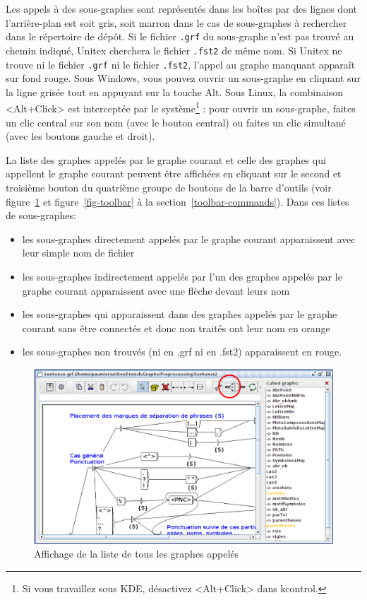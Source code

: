 
\bigskip
\noindent Les appels à des sous-graphes sont représentés dans les boîtes par des lignes dont
l’arrière-plan est soit gris, soit marron dans le cas de sous-graphes à rechercher dans le 
répertoire de dépôt. Si le fichier \verb+.grf+ du sous-graphe n'est pas trouvé au chemin indiqué,
Unitex cherchera le fichier \verb+.fst2+ de même nom. Si Unitex ne trouve ni le fichier \verb+.grf+
ni le fichier \verb+.fst2+, l'appel au graphe manquant apparaît sur fond rouge. Sous Windows, vous
pouvez ouvrir un sous-graphe en cliquant sur la ligne grisée tout en appuyant sur la touche Alt.
Sous Linux, la combinaison <Alt+Click> est interceptée par le système\footnote{Si vous travaillez
sous KDE, désactivez <Alt+Click> dans kcontrol.} :
pour ouvrir un sous-graphe, faites un clic central sur son nom (avec le bouton central) ou faites un clic simultané (avec les boutons gauche
et droit).


\bigskip
\noindent La liste des graphes appelés par le graphe courant et celle des graphes qui appellent le
graphe courant peuvent être affichées en cliquant sur le second et troisième bouton du quatrième
groupe de boutons de la barre d'outils (voir figure~\ref{list-called-graphs} et
figure~\ref{fig-toolbar} à la section~\ref{toolbar-commands}).
Dans ces listes de sous-graphes:
\begin{itemize}
\item les sous-graphes directement appelés par le graphe courant apparaissent avec leur simple nom
	de fichier
\item les sous-graphes indirectement appelés par l'un des graphes appelés par le graphe courant
	apparaissent avec une flèche devant leurs nom
\item les sous-graphes qui apparaissent dans des graphes appelés par le graphe courant sans être
	connectés et donc non traités  ont leur nom en orange
\item les sous-graphes non trouvés (ni en .grf ni en .fst2) apparaissent en rouge.
\end{itemize}

\begin{figure}[!h]
\begin{center}
\includegraphics[width=15.2cm]{resources/img/fig5-12b.png}
\caption{Affichage de la liste de tous les graphes appelés\label{list-called-graphs}}
\end{center}
\end{figure}



